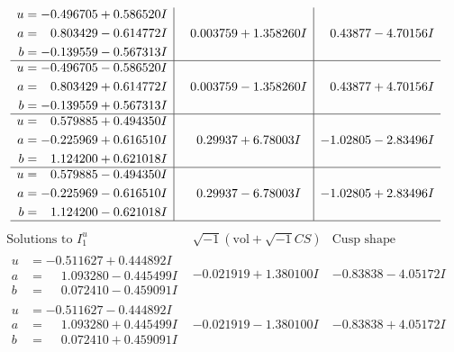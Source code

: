 \documentclass[1p]{elsarticle_modified}
\theoremstyle{definition}
\newcommand{\I}{\sqrt{-1}}
\begin{document}
$$\begin{array}{c|c|c}
\begin{aligned}
u &= -0.496705 + 0.586520 I \\
a &= \phantom{-}0.803429 - 0.614772 I \\
b &= -0.139559 - 0.567313 I\end{aligned}
 & \phantom{-}0.003759 + 1.358260 I & \phantom{-}0.43877 - 4.70156 I \\ \hline\begin{aligned}
u &= -0.496705 - 0.586520 I \\
a &= \phantom{-}0.803429 + 0.614772 I \\
b &= -0.139559 + 0.567313 I\end{aligned}
 & \phantom{-}0.003759 - 1.358260 I & \phantom{-}0.43877 + 4.70156 I \\ \hline\begin{aligned}
u &= \phantom{-}0.579885 + 0.494350 I \\
a &= -0.225969 + 0.616510 I \\
b &= \phantom{-}1.124200 + 0.621018 I\end{aligned}
 & \phantom{-}0.29937 + 6.78003 I & -1.02805 - 2.83496 I \\ \hline\begin{aligned}
u &= \phantom{-}0.579885 - 0.494350 I \\
a &= -0.225969 - 0.616510 I \\
b &= \phantom{-}1.124200 - 0.621018 I\end{aligned}
 & \phantom{-}0.29937 - 6.78003 I & -1.02805 + 2.83496 I\\
 \hline 
 \end{array}$$\newpage$$\begin{array}{c|c|c}  
\text{Solutions to }I^u_{1}& \I (\text{vol} + \sqrt{-1}CS) & \text{Cusp shape}\\
 \hline 
\begin{aligned}
u &= -0.511627 + 0.444892 I \\
a &= \phantom{-}1.093280 - 0.445499 I \\
b &= \phantom{-}0.072410 - 0.459091 I\end{aligned}
 & -0.021919 + 1.380100 I & -0.83838 - 4.05172 I \\ \hline\begin{aligned}
u &= -0.511627 - 0.444892 I \\
a &= \phantom{-}1.093280 + 0.445499 I \\
b &= \phantom{-}0.072410 + 0.459091 I\end{aligned}
 & -0.021919 - 1.380100 I & -0.83838 + 4.05172 I \\ \hline\begin{aligned}

\end{aligned}
\end{array}$$
\end{document}
